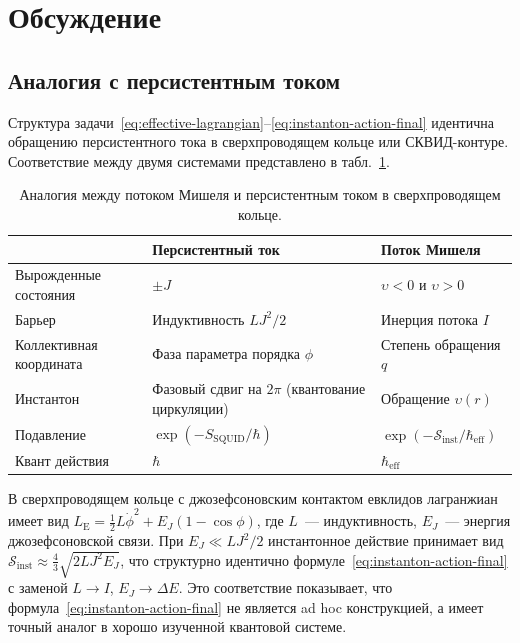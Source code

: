 \documentclass[12pt,a4paper,preprint]{elsarticle}
\begin{document}
    \section{Обсуждение}\label{sec:discussion}
        \subsection{Аналогия с персистентным током}\label{subsec:persistent-current}
            Структура задачи~\eqref{eq:effective-lagrangian}--\eqref{eq:instanton-action-final} идентична обращению персистентного тока в сверхпроводящем кольце или СКВИД-контуре. Соответствие между двумя системами представлено в табл.~\ref{tab:analogy}.
            \begin{table}[htb]
                \centering
                \caption{Аналогия между потоком Мишеля и персистентным током в сверхпроводящем кольце.}
                \label{tab:analogy}
                \small
                \begin{tabular}{lll}
                    \toprule
                    & Персистентный ток & Поток Мишеля \\
                    \midrule
                    Вырожденные состояния & $\pm J$ & $\upsilon < 0$ и $\upsilon > 0$ \\
                    Барьер & Индуктивность $LJ^{2}/2$ & Инерция потока $I$ \\
                    Коллективная координата & Фаза параметра порядка $\phi$ & Степень обращения $q$ \\
                    Инстантон & Фазовый сдвиг на $2\pi$ (квантование циркуляции) & Обращение $\upsilon(r)$ \\
                    Подавление & $\exp(-S_{\mathrm{SQUID}}/\hbar)$ & $\exp(-\mathcal{S}_{\mathrm{inst}}/\hbar_{\mathrm{eff}})$ \\
                    Квант действия & $\hbar$ & $\hbar_{\mathrm{eff}}$ \\
                    \bottomrule
                \end{tabular}
            \end{table}
            В сверхпроводящем кольце с джозефсоновским контактом евклидов лагранжиан имеет вид $L_{\mathrm{E}} = \frac{1}{2}L\dot{\phi}^{2} + E_{J}(1 - \cos\phi)$, где $L$~--- индуктивность, $E_{J}$~--- энергия джозефсоновской связи. При $E_{J} \ll LJ^{2}/2$ инстантонное действие принимает вид $\mathcal{S}_{\mathrm{inst}} \approx \frac{4}{3}\sqrt{2LJ^{2}E_{J}}$, что структурно идентично формуле~\eqref{eq:instanton-action-final} с заменой $L \to I$, $E_{J} \to \Delta E$. Это соответствие показывает, что формула~\eqref{eq:instanton-action-final} не является ad hoc конструкцией, а имеет точный аналог в хорошо изученной квантовой системе.
            
\end{document}
